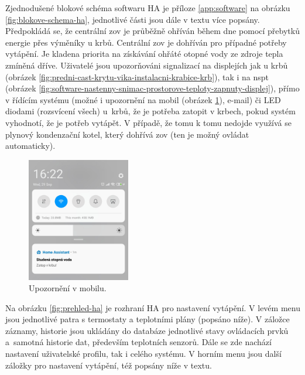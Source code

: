 Zjednodušené blokové schéma softwaru HA je příloze \ref{app:software} na obrázku \ref{fig:blokove-schema-ha}, jednotlivé části jsou dále v textu více popsány. Předpokládá se, že centrální \acrshort{zov} je průběžně ohříván během dne pomocí přebytků energie přes výměníky u krbů. Centrální \acrshort{zov} je dohříván pro případné potřeby vytápění. Je kladena priorita na získávání ohřáté otopné vody ze zdroje tepla zmíněná dříve. Uživatelé jsou upozorňováni signalizací na displejích jak u krbů (obrázek \ref{fig:predni-cast-krytu-vika-instalacni-krabice-krb}), tak i na \acrshort{nspt} (obrázek \ref{fig:software-nastenny-snimac-prostorove-teploty-zapnuty-displej}), přímo v řídícím systému (možné i upozornění  na mobil (obrázek \ref{fig:mobil-notifikace}), e-mail) či LED diodami (rozsvícení všech) u~krbů, že je potřeba zatopit v krbech, pokud systém vyhodnotí, že je potřeb vytápět. V případě, že tomu k tomu nedojde využívá se plynový kondenzační kotel, který dohřívá \acrshort{zov} (ten je možný ovládat automaticky).

\begin{figure}[H]
    \centering
    \includegraphics[width=0.4\textwidth]{images/software-ha/mobil-notifikace.png}
    \caption{Upozornění v mobilu.}
    \label{fig:mobil-notifikace}
\end{figure}

Na obrázku \ref{fig:prehled-ha} je rozhraní HA pro nastavení vytápění. V levém menu jsou jednotlivé patra s termostaty a teplotními plány (popsáno níže). V záložce záznamy, historie jsou ukládány do databáze jednotlivé stavy ovládacích prvků a~samotná historie dat, především teplotních senzorů. Dále se zde nachází nastavení uživatelské profilu, tak i celého systému. V horním menu jsou další záložky pro nastavení vytápění, též popsány níže v textu.

